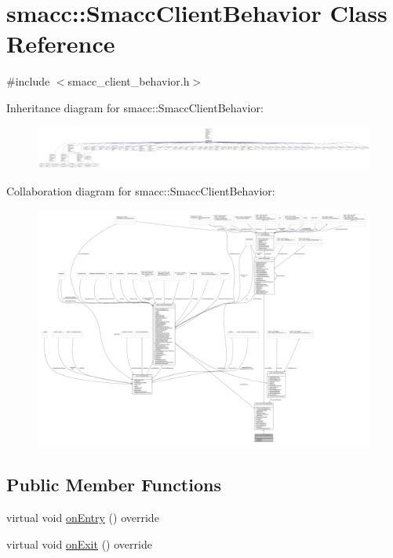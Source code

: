 \hypertarget{classsmacc_1_1SmaccClientBehavior}{}\section{smacc\+:\+:Smacc\+Client\+Behavior Class Reference}
\label{classsmacc_1_1SmaccClientBehavior}


{\ttfamily \#include $<$smacc\+\_\+client\+\_\+behavior.\+h$>$}



Inheritance diagram for smacc\+:\+:Smacc\+Client\+Behavior\+:
\nopagebreak
\begin{figure}[H]
\begin{center}
\leavevmode
\includegraphics[width=350pt]{classsmacc_1_1SmaccClientBehavior__inherit__graph}
\end{center}
\end{figure}


Collaboration diagram for smacc\+:\+:Smacc\+Client\+Behavior\+:
\nopagebreak
\begin{figure}[H]
\begin{center}
\leavevmode
\includegraphics[width=350pt]{classsmacc_1_1SmaccClientBehavior__coll__graph}
\end{center}
\end{figure}
\subsection*{Public Member Functions}
\begin{DoxyCompactItemize}
\item 
virtual void \hyperlink{classsmacc_1_1SmaccClientBehavior_ad5d3e1f1697c3cfe66c94cadba948493}{on\+Entry} () override
\item 
virtual void \hyperlink{classsmacc_1_1SmaccClientBehavior_a7e4fb6ce81ff96dc172425852d69c0c5}{on\+Exit} () override
\end{DoxyCompactItemize}
